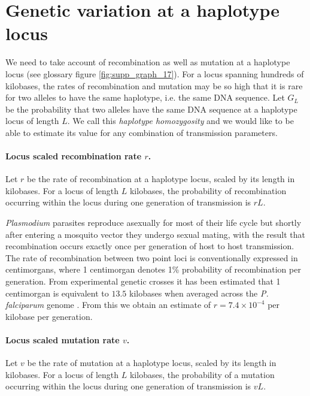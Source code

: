 \documentclass[_main.tex]{subfiles}
\begin{document}
\section*{Genetic variation at a haplotype locus} \label{main_haplo}

We need to take account of recombination as well as mutation at a haplotype locus (see glossary figure \ref{fig:supp_graph_17}).  For a locus spanning hundreds of kilobases, the rates of recombination and mutation may be so high that it is rare for two alleles to have the same haplotype, i.e. the same DNA sequence.  Let $G_L$ be the probability that two alleles have the same DNA sequence at a haplotype locus of length $L$.  We call this \textit{haplotype homozygosity} and we would like to be able to estimate its value for any combination of transmission parameters.

\paragraph{Locus scaled recombination rate $r$.}  Let $r$ be the rate of recombination at a haplotype locus, scaled by its length in kilobases.   For a locus of length $L$ kilobases, the probability of recombination occurring within the locus during one generation of transmission is $rL$.

\textit{Plasmodium} parasites reproduce asexually for most of their life cycle but shortly after entering a mosquito vector they undergo sexual mating, with the result that recombination occurs exactly once per generation of host to host transmission.  The rate of recombination between two point loci is conventionally expressed in centimorgans, where 1 centimorgan denotes 1\% probability of recombination per generation.  From experimental genetic crosses it has been estimated that 1 centimorgan is equivalent to $13.5$ kilobases when averaged across the \textit{P. falciparum} genome \cite{Miles2016}.  From this we obtain an estimate of $r = 7.4 \times 10^{-4}$ per kilobase per generation.

\paragraph{Locus scaled mutation rate $v$.}  Let $v$ be the rate of mutation at a haplotype locus, scaled by its length in kilobases.   For a locus of length $L$ kilobases, the probability of a mutation occurring within the locus during one generation of transmission is $vL$.
\end{document}
